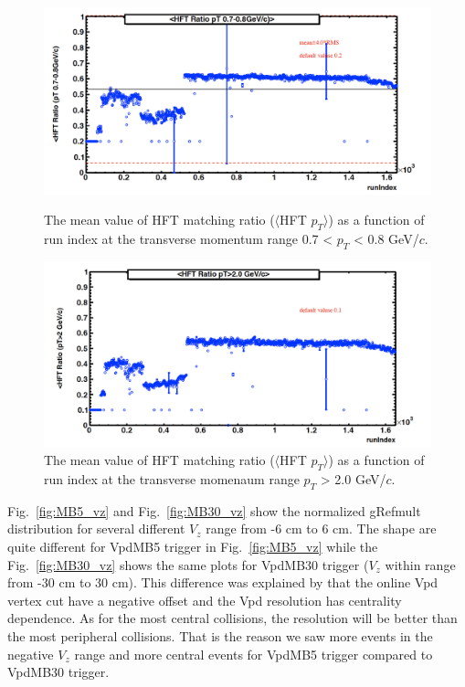 \documentclass[a4paper]{article}
\begin{document}
\begin{figure}[htbp]
\begin{minipage}[htbp]{0.52\linewidth}
\centering
\includegraphics[width=1.0\textwidth]{fig/centrality_HFTratio.png}
\caption{The mean value of HFT matching ratio ($\langle$HFT $p_{T}$$\rangle$) as a function of run index at the transverse momentum range 0.7 < $p_{T}$ < 0.8 GeV/$c$.\label{fig:centrality_QA3}}
\end{minipage}
\hfill
\begin{minipage}[htbp]{0.52\linewidth}
\centering
\includegraphics[width=1.0\textwidth]{fig/centrality_HFTratio2.png} 
\caption{The mean value of HFT matching ratio ($\langle$HFT $p_{T}$$\rangle$) as a function of run index at the transverse momenaum range $p_{T}$ > 2.0 GeV/$c$.\label{fig:centrality_QA4}}
\end{minipage}
\end{figure}

Fig.~\ref{fig:MB5_vz} and Fig.~\ref{fig:MB30_vz} show the normalized gRefmult distribution for several different $V_{z}$ range from -6 cm to 6 cm. The shape are quite different for VpdMB5 trigger in Fig.~\ref{fig:MB5_vz} while the Fig.~\ref{fig:MB30_vz} shows the same plots for VpdMB30 trigger ($V_z$ within range from -30 cm to 30 cm). This difference was explained by that the online Vpd vertex cut have a negative offset and the Vpd resolution has centrality dependence. As for the most central collisions, the resolution will be better than the most peripheral collisions. That is the reason we saw more events in the negative $V_{z}$ range and more central events for VpdMB5 trigger compared to VpdMB30 trigger.
\end{document}
